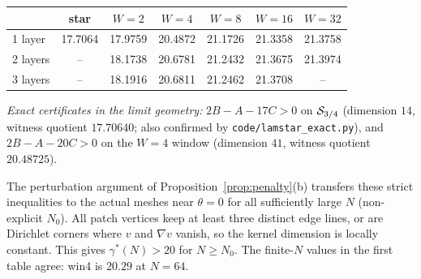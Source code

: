 \begin{center}\small
\begin{tabular}{lcccccc}
\toprule
 & star & $W=2$ & $W=4$ & $W=8$ & $W=16$ & $W=32$\\
\midrule
1 layer & 17.7064 & 17.9759 & 20.4872 & 21.1726 & 21.3358 & 21.3758\\
2 layers & -- & 18.1738 & 20.6781 & 21.2432 & 21.3675 & 21.3974\\
3 layers & -- & 18.1916 & 20.6811 & 21.2462 & 21.3708 & --\\
\bottomrule
\end{tabular}
\end{center}

\emph{Exact certificates in the limit geometry:} $2B-A-17C>0$ on $\mathcal S_{3/4}$ (dimension $14$, witness quotient $17.70640$; also
confirmed by \texttt{code/lamstar\_exact.py}), and $2B-A-20C>0$ on the $W=4$ window (dimension $41$, witness quotient
$20.48725$).

The perturbation argument of Proposition~\ref{prop:penalty}(b) transfers these strict inequalities to the actual meshes near
$\theta=0$ for all sufficiently large $N$ (non-explicit $N_0$). All patch vertices keep at least three distinct edge lines, or
are Dirichlet corners where $v$ and $\nabla v$ vanish, so the kernel dimension is locally constant. This gives
$\gamma^\ast(N)>20$ for $N\ge N_0$. The finite-$N$ values in the first table agree: win4 is $20.29$ at $N=64$.

